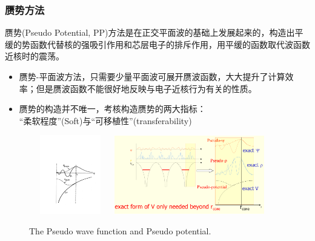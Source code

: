 \documentclass[cjk,slidestop,compress,mathserif,blue]{beamer}
\begin{document}
\frame
{
\frametitle{赝势方法}
赝势(\textrm{Pseudo Potential, PP})方法是在正交平面波的基础上发展起来的，构造出平缓的势函数代替核的强吸引作用和芯层电子的排斥作用，用平缓的函数取代波函数近核时的震荡。
\begin{itemize}
\setlength{\itemsep}{5pt}
	\item 赝势-平面波方法，只需要少量平面波可展开赝波函数，大大提升了计算效率；但是赝波函数不能很好地反映与电子近核行为有关的性质。
	\item 赝势的构造并不唯一，考核构造赝势的两大指标：\\“柔软程度”\textrm{(Soft)}与“可移植性”\textrm{(transferability)}
\end{itemize}
\begin{figure}[h!]
\centering
\vspace*{-0.10in}
\includegraphics[height=1.35in,width=1.42in,viewport=154 100 562 508,clip]{Figures/Pseudo.pdf}
\includegraphics[height=1.35in,width=2.57in,viewport=1 1 980 500,clip]{Figures/Pseudo-2.png}
\caption{\small \textrm{The Pseudo wave function and Pseudo potential.}}%
\label{Pseudo_Potential-Wave}
\end{figure}
}
\end{document}
